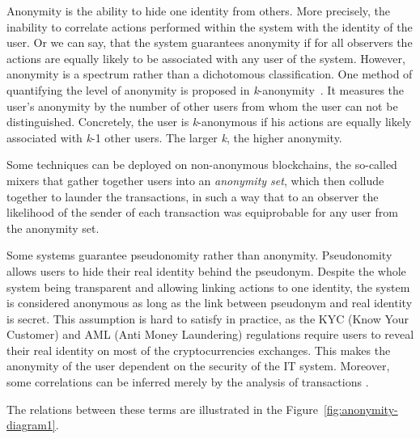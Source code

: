 \documentclass{ieeeaccess}
\begin{document}
Anonymity is the ability to hide one identity from others. More precisely, the inability to correlate actions performed within the system with the identity of the user. Or we can say, that the system guarantees anonymity if for all observers the actions are equally likely to be associated with any user of the system. However, anonymity is a spectrum rather than a dichotomous classification. One method of quantifying the level of anonymity is proposed in \textit{k}-anonymity~\cite{sweeney2002k}. It measures the user's anonymity by the number of other users from whom the user can not be distinguished. Concretely, the user is \textit{k}-anonymous if his actions are equally likely associated with \textit{k}-1 other users. The larger \textit{k}, the higher anonymity.

Some techniques can be deployed on non-anonymous blockchains, the so-called mixers that gather together users into an \textit{anonymity set}, which then collude together to launder the transactions, in such a way that to an observer the likelihood of the sender of each transaction was equiprobable for any user from the anonymity set.

Some systems guarantee pseudonomity rather than anonymity. Pseudonomity allows users to hide their real identity behind the pseudonym. Despite the whole system being transparent and allowing linking actions to one identity, the system is considered anonymous as long as the link between pseudonym and real identity is secret. This assumption is hard to satisfy in practice, as the KYC (Know Your Customer) and AML (Anti Money Laundering) regulations require users to reveal their real identity on most of the cryptocurrencies exchanges. This makes the anonymity of the user dependent on the security of the IT system. Moreover, some correlations can be inferred merely by the analysis of transactions \cite{androulaki2013evaluating, ober2013structure}.

The relations between these terms are illustrated in the Figure~\ref{fig:anonymity-diagram1}.
\end{document}
